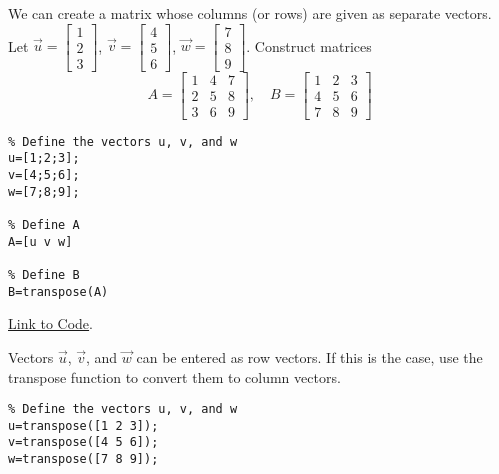 \documentclass{ximera}
\begin{document}
\begin{template}
    We can create a matrix whose columns (or rows) are given as separate vectors.
    Let $\vec{u}=\begin{bmatrix}1\\2\\3\end{bmatrix}$, $\vec{v}=\begin{bmatrix}4\\5\\6\end{bmatrix}$, $\vec{w}=\begin{bmatrix}7\\8\\9\end{bmatrix}$.  Construct matrices
    $$A=\begin{bmatrix}1 & 4 &7\\2 & 5 & 8\\3 & 6 & 9\end{bmatrix},\quad B=\begin{bmatrix}1 & 2 & 3\\4 & 5 & 6\\7 & 8 & 9\end{bmatrix}$$

    \begin{verbatim}
% Define the vectors u, v, and w
u=[1;2;3];
v=[4;5;6];
w=[7;8;9];

% Define A
A=[u v w]

% Define B
B=transpose(A)
    \end{verbatim}

\href{https://sagecell.sagemath.org/?z=eJxTVXBJTcvMS1UoyUhVKEtNLskvKlYo1VEo01FIzEtRKOflKrWNNrQ2sjaOteblKrONNrE2tTYDsctto82tLawtQWxeLlWYOY68XI620aUKZQrlsSgSTrxcTrYlRYl5xQX5xakajpoAN80hMA==&lang=octave&interacts=eJyLjgUAARUAuQ==}{Link to Code}.
\begin{remark}
    Vectors $\vec{u}$, $\vec{v}$, and $\vec{w}$ can be entered as row vectors.  If this is the case, use the transpose function to convert them to column vectors.
    \begin{verbatim}
% Define the vectors u, v, and w
u=transpose([1 2 3]);
v=transpose([4 5 6]);
w=transpose([7 8 9]);
    \end{verbatim}
\end{remark}
\end{template}
\end{document}
